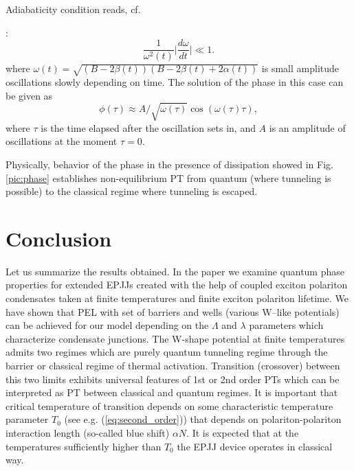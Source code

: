 \documentclass[aps, pre, preprint, groupedaddress, superscriptaddress, showkeys, showpacs] {revtex4-1}
\begin{document}
{Adiabaticity condition reads, cf. {\cite{Sols}:
%
\begin{equation}
\dfrac{1}{\omega^2(t)} \Big| \dfrac{d \omega}{d t} \Big| \ll 1.
\end{equation}
%
where $\omega(t) = \sqrt{(B - 2\beta(t))(B - 2 \beta(t) + 2 \alpha(t))}$ is small amplitude oscillations slowly depending on time. 
%
%
The solution of the phase in this case can be given as 
\begin{equation}
\phi(\tau) \approx A / \sqrt{\omega(\tau)} \cos (\omega(\tau) \tau),
\end{equation}
%
where $\tau$ is the time elapsed after the oscillation sets in, and $A$ is an amplitude of oscillations at the moment $\tau = 0$.

Physically, behavior of the phase in the presence of dissipation showed in Fig. \ref{pic:phase} establishes non-equilibrium PT from quantum (where tunneling is possible) to the classical regime where tunneling is escaped. 

\section{Conclusion \label{sec:conclusion}}

Let us summarize the results obtained. In the paper we examine quantum phase properties for  extended EPJJs created with the help of coupled exciton polariton condensates taken at finite temperatures and finite exciton polariton lifetime. We have shown that  PEL with set of barriers and wells (various W--like potentials) can be achieved for our model  depending on the $\Lambda$ and $\lambda$ parameters which characterize condensate junctions. The W-shape potential at finite temperatures admits two regimes which are  purely quantum tunneling regime through the barrier or classical regime of thermal activation.   Transition (crossover) between this two limits exhibits universal features of 1st or 2nd order PTs which can be interpreted as PT between classical and quantum regimes. It is important that critical temperature of transition depends on some  characteristic temperature  parameter $T_{0}$ (see e.g. (\ref{eq:second_order})) that depends on polariton-polariton interaction length (so-called blue shift) $\alpha N$.  It is expected that  at the temperatures sufficiently higher than  $T_{0}$ the EPJJ device operates in classical way. 

}}
\end{document}
